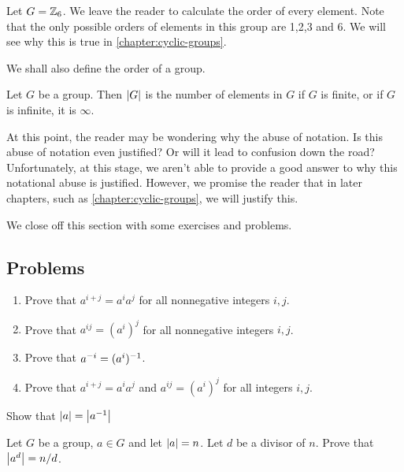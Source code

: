 \documentclass[./algebra-notes.tex]{subfiles}
\begin{document}
\begin{example}
    Let $G = \mathbb{Z}_6$. We leave the reader to calculate the order of every
    element. Note that the only possible orders of elements in this group are
    1,2,3 and 6. We will see why this is true in \cref{chapter:cyclic-groups}.
\end{example}

We shall also define the order of a group.
\begin{definition}
\label{def:order-of-a-group}
    Let $G$ be a group. Then $\abs{G}$ is the number of elements in $G$ if $G$
    is finite, or if $G$ is infinite, it is $\infty$.    
\end{definition}
At this point, the reader may be wondering why the abuse of notation. Is this
abuse of notation even justified? Or will it lead to confusion down the road?
Unfortunately, at this stage, we aren't able to provide a good answer to why
this notational abuse is justified. However, we promise the reader that in later
chapters, such as \cref{chapter:cyclic-groups}, we will justify this.

We close off this section with some exercises and problems.
\subsection{Problems}

\begin{exercise}
\label{ex:power-notation}
    \begin{enumerate}
        \item Prove that $a^{i+j} = a^i a^j$ for all nonnegative integers $i, j$.
        \item Prove that $a^{ij} = (a^i)^j$ for all nonnegative integers $i, j$.
        \item Prove that $a^{-i} = (a^i)^{-1}$.
        \item Prove that $a^{i+j} = a^i a^j$ and $a^{ij} = (a^i)^j$ for all
        integers $i, j$.
    \end{enumerate}
\end{exercise}

\begin{exercise}
    Show that $\abs{a} = \abs{a^{-1}}$
\end{exercise}

\begin{exercise}
\label{ex:powering-element-orders}
    Let $G$ be a group, $a \in G$ and let $\abs{a} = n$. Let $d$ be a divisor of
    $n$. Prove that $\abs{a^d} = n/d$.
\end{exercise}
\end{document}
